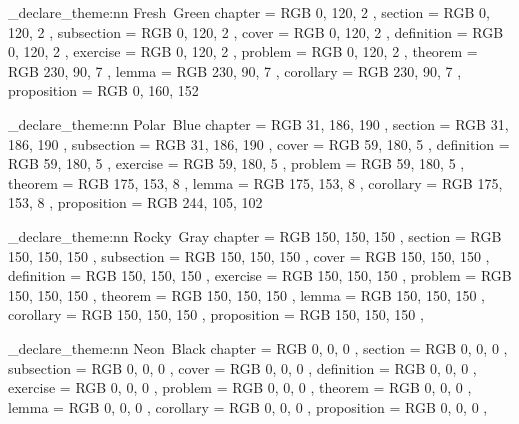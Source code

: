 \elegant_declare_theme:nn { Fresh~Green }
  {
    chapter      =   {RGB}{ 0,   120, 2   },
    section      =   {RGB}{ 0,   120, 2   },
    subsection   =   {RGB}{ 0,   120, 2   },
    cover        =   {RGB}{ 0,   120, 2   },
    definition   =   {RGB}{ 0,   120, 2   },
    exercise     =   {RGB}{ 0,   120, 2   },
    problem      =   {RGB}{ 0,   120, 2   },
    theorem      =   {RGB}{ 230, 90,  7   },
    lemma        =   {RGB}{ 230, 90,  7   },
    corollary    =   {RGB}{ 230, 90,  7   },
    proposition  =   {RGB}{ 0,   160, 152 }
  }

\elegant_declare_theme:nn { Polar~Blue }
  {
    chapter      =   {RGB}{ 31,  186, 190 },
    section      =   {RGB}{ 31,  186, 190 },
    subsection   =   {RGB}{ 31,  186, 190 },
    cover        =   {RGB}{ 59,  180, 5   },
    definition   =   {RGB}{ 59,  180, 5   },
    exercise     =   {RGB}{ 59,  180, 5   },
    problem      =   {RGB}{ 59,  180, 5   },
    theorem      =   {RGB}{ 175, 153, 8   },
    lemma        =   {RGB}{ 175, 153, 8   },
    corollary    =   {RGB}{ 175, 153, 8   },
    proposition  =   {RGB}{ 244, 105, 102 }
  }


\elegant_declare_theme:nn { Rocky~Gray }
  {
    chapter      =   {RGB}{ 150, 150, 150 },
    section      =   {RGB}{ 150, 150, 150 },
    subsection   =   {RGB}{ 150, 150, 150 },
    cover        =   {RGB}{ 150, 150, 150 },
    definition   =   {RGB}{ 150, 150, 150 },
    exercise     =   {RGB}{ 150, 150, 150 },
    problem      =   {RGB}{ 150, 150, 150 },
    theorem      =   {RGB}{ 150, 150, 150 },
    lemma        =   {RGB}{ 150, 150, 150 },
    corollary    =   {RGB}{ 150, 150, 150 },
    proposition  =   {RGB}{ 150, 150, 150 },
  }

\elegant_declare_theme:nn { Neon~Black }
  {
    chapter      =   {RGB}{ 0,   0,   0   },
    section      =   {RGB}{ 0,   0,   0   },
    subsection   =   {RGB}{ 0,   0,   0   },
    cover        =   {RGB}{ 0,   0,   0   },
    definition   =   {RGB}{ 0,   0,   0   },
    exercise     =   {RGB}{ 0,   0,   0   },
    problem      =   {RGB}{ 0,   0,   0   },
    theorem      =   {RGB}{ 0,   0,   0   },
    lemma        =   {RGB}{ 0,   0,   0   },
    corollary    =   {RGB}{ 0,   0,   0   },
    proposition  =   {RGB}{ 0,   0,   0   },
  }

\endinput
